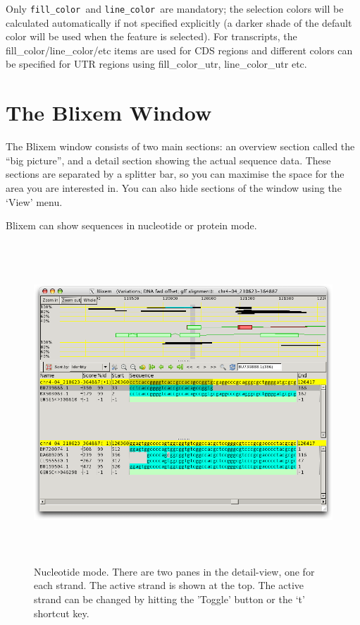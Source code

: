 \documentclass[letterpaper]{article}
\begin{document}
{Only \texttt{fill\_color }and \texttt{line\_color }are mandatory; the
selection colors will be calculated automatically if not specified
explicitly (a darker shade of the default color will be used when the
feature is selected). For transcripts, the
fill\_color/line\_color/etc items are used for CDS regions and
different colors can be specified for UTR regions using
fill\_color\_utr, line\_color\_utr etc.}

{\color[rgb]{0.0,0.27058825,0.5254902}\section[The Blixem Window]{The Blixem Window}}
{The Blixem window consists of two main sections: an overview section
called the {\textquotedblleft}big picture{\textquotedblright}, and a
detail section showing the actual sequence data. These sections are
separated by a splitter bar, so you can maximise the space for the area
you are interested in. You can also hide sections of the window using
the {\textquoteleft}View{\textquoteright} menu.}

\bigskip

{Blixem can show sequences in nucleotide or protein mode.}

\begin{figure}
\centering
\color[rgb]{0.30980393,0.5058824,0.7411765}
\includegraphics[width=15.231cm,height=11.972cm]{img_window_nucleotide_mode.png}
\caption{Nucleotide mode. There are two panes in the detail-view, one for each strand. 
The active strand is shown at the top. The active strand can be changed by hitting 
the {\textquoteright}Toggle{\textquoteright} button or the
 {\textquoteleft}t{\textquoteright} shortcut key.}
\end{figure}
\end{document}
